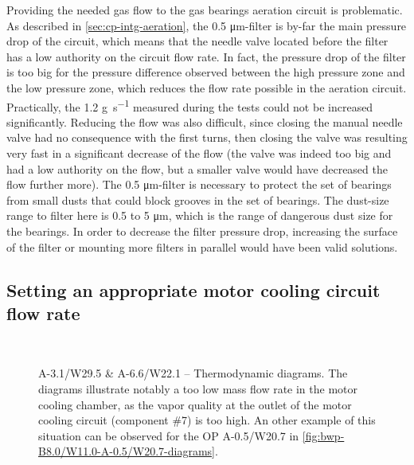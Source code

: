 Providing the needed gas flow to the gas bearings aeration circuit is
problematic. As described in \cref{sec:cp-intg-aeration}, the 0.5
\si{\micro\meter}-filter is by-far the main pressure drop of the
circuit, which means that the needle valve located before the filter
has a low authority on the circuit flow rate. In fact, the pressure
drop of the filter is too big for the pressure difference observed
between the high pressure zone and the low pressure zone, which
reduces the flow rate possible in the aeration circuit. Practically,
the 1.2 \si{\gram\per\second} measured during the tests could not be
increased significantly. Reducing the flow was also difficult, since
closing the manual needle valve had no consequence with the first
turns, then closing the valve was resulting very fast in a significant
decrease of the flow (the valve was indeed too big and had a low
authority on the flow, but a smaller valve would have decreased the
flow further more). The 0.5 \si{\micro\meter}-filter is necessary to
protect the set of bearings from small dusts that could block grooves
in the set of bearings. The dust-size range to filter here is 0.5 to 5
\si{\micro\meter}, which is the range of dangerous dust size for the
bearings. In order to decrease the filter pressure drop, increasing
the surface of the filter or mounting more filters in parallel would
have been valid solutions.


\subsection{Setting an appropriate motor cooling circuit
  flow rate}
\label{sec:awp-issue-motor-cooling}


\begin{figure}[htbp]
  \centering
  \hspace{1em}
  \\
  \hspace{1em}
  \caption[A-3.1/W29.5 \& A-6.6/W22.1 -- Thermodynamic
  diagrams]{A-3.1/W29.5 \& A-6.6/W22.1 -- Thermodynamic diagrams. The
    diagrams illustrate notably a too low mass flow rate in the motor
    cooling chamber, as the vapor quality at the outlet of the motor
    cooling circuit (component \#7) is too high. An other example of
    this situation can be observed for the OP A-0.5/W20.7 in
    \cref{fig:bwp-B8.0/W11.0-A-0.5/W20.7-diagrams}.}
  \label{fig:awp-too-high-motor-cooling-flow}
\end{figure}

